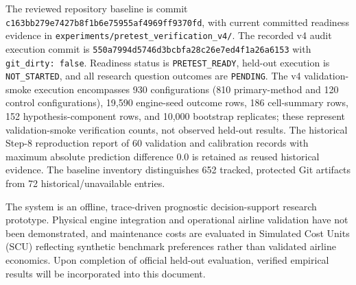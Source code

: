 The reviewed repository baseline is commit \texttt{c163bb279e7427b8f1b6e75955af4969ff9370fd}, with current committed readiness evidence in \texttt{experiments/pretest\_verification\_v4/}. The recorded v4 audit execution commit is \texttt{550a7994d5746d3bcbfa28c26e7ed4f1a26a6153} with \texttt{git\_dirty: false}. Readiness status is \texttt{PRETEST\_READY}, held-out execution is \texttt{NOT\_STARTED}, and all research question outcomes are \texttt{PENDING}. The v4 validation-smoke execution encompasses 930 configurations (810 primary-method and 120 control configurations), 19,590 engine-seed outcome rows, 186 cell-summary rows, 152 hypothesis-component rows, and 10,000 bootstrap replicates; these represent validation-smoke verification counts, not observed held-out results. The historical Step-8 reproduction report of 60 validation and calibration records with maximum absolute prediction difference 0.0 is retained as reused historical evidence. The baseline inventory distinguishes 652 tracked, protected Git artifacts from 72 historical/unavailable entries.

The system is an offline, trace-driven prognostic decision-support research prototype. Physical engine integration and operational airline validation have not been demonstrated, and maintenance costs are evaluated in Simulated Cost Units (SCU) reflecting synthetic benchmark preferences rather than validated airline economics. Upon completion of official held-out evaluation, verified empirical results will be incorporated into this document.
